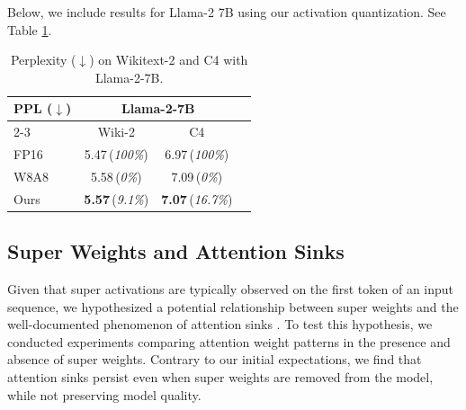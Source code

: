\documentclass{article} %
\begin{document}
Below, we include results for Llama-2 7B using our activation quantization. See Table \ref{tab:act_quant_ours_more}.

\begin{table}[hb]
    \centering
    \small
    \begin{tabular}{l ccc}
        \toprule
        \textbf{PPL ($\downarrow$)} & \multicolumn{2}{c}{Llama-2-7B} \\
        \cmidrule(lr){2-3}
         & Wiki-2 & C4  \\
        \midrule
        FP16 & 5.47\tiny{\,(\textit{100\%})\hspace{-1pt}} & 6.97\tiny{\,(\textit{100\%})\hspace{-1pt}} \\
        \midrule
        W8A8 & 5.58\tiny{\,(\textit{0\%})\hspace{5pt}} & 7.09\tiny{\,(\textit{0\%})\hspace{5pt}} \\
        \midrule
        Ours & \textbf{5.57}\tiny{\,(\textit{9.1\%})\hspace{1pt}} & \textbf{7.07}\tiny{\,(\textit{16.7\%})\hspace{1pt}} \\
        \bottomrule
    \end{tabular}
    \caption{Perplexity ($\downarrow$) on Wikitext-2 and C4 with Llama-2-7B.}
    \label{tab:act_quant_ours_more}
    
\end{table}


\subsection{Super Weights and Attention Sinks}
Given that super activations are typically observed on the first token of an input sequence, we hypothesized a potential relationship between super weights and the well-documented phenomenon of attention sinks \citep{xiao2024efficient, son2024prefixing}. To test this hypothesis, we conducted experiments comparing attention weight patterns in the presence and absence of super weights. Contrary to our initial expectations, we find that attention sinks persist even when super weights are removed from the model, while not preserving model quality. 
\end{document}
